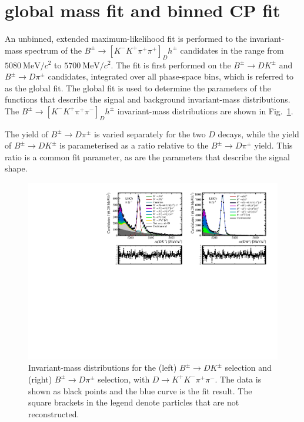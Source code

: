 \documentclass[12pt, a4paper, notitlepage, onecolumn]{article}
\begin{document}
\section{\texorpdfstring{}{B2DhD2KKpipi} global mass fit and binned CP fit}
\noindent An unbinned, extended maximum-likelihood fit is performed to the invariant-mass spectrum of the $B^\pm\to[K^-K^+\pi^+\pi^+]_Dh^\pm$ candidates in the range from $\SI{5080}{\mega\eV/c^2}$ to $\SI{5700}{\mega\eV/c^2}$. The fit is first performed on the $B^\pm\to DK^\pm$ and $B^\pm\to D\pi^\pm$ candidates, integrated over all phase-space bins, which is referred to as the global fit. The global fit is used to determine the parameters of the functions that describe the signal and background invariant-mass distributions. The $B^\pm\to[K^-K^+\pi^+\pi^-]_Dh^\pm$ invariant-mass distributions are shown in Fig.~\ref{figure:Global_fit}.

The yield of $B^\pm\to D\pi^\pm$ is varied separately for the two $D$ decays, while the yield of $B^\pm\to DK^\pm$ is parameterised as a ratio relative to the $B^\pm\to D\pi^\pm$ yield. This ratio is a common fit parameter, as are the parameters that describe the signal shape.

\begin{figure}[htb]
    \centering
    \includegraphics[width=1.0\textwidth,trim={0 2.9cm 0 0},clip]{Plots/d2kkpipi_fiveL_allDP.pdf}
    \caption{Invariant-mass distributions for the (left) $B^\pm\to DK^\pm$ selection and (right) $B^\pm\to D\pi^\pm$ selection, with $D\to K^+K^-\pi^+\pi^-$. The data is shown as black points and the blue curve is the fit result. The square brackets in the legend denote particles that are not reconstructed.}
    \label{figure:Global_fit}
\end{figure}
\end{document}
